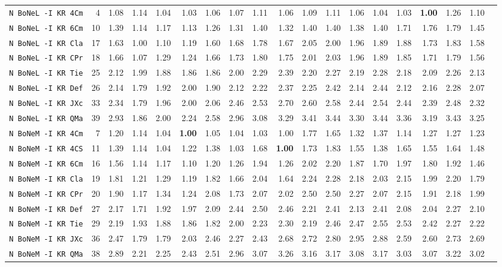 \begin{tabular}{l | r @{~~} r | r@{~~}r@{~~}r@{~~}r@{~~}r@{~~}r@{~~}r@{~~}r@{~~}r@{~~}r@{~~}r@{~~}r@{~~}r@{~~}r@{~~}r@{~~}r|}
\verb+N BoNeL -I KR 4Cm+ & 4 & 1.08 & 1.14&1.04&1.03&1.06&1.07&1.11&1.06&1.09&1.11&1.06&1.04&1.03&\textbf{1.00}&1.26&1.10\\
\verb+N BoNeL -I KR 6Cm+ & 10 & 1.39 & 1.14&1.17&1.13&1.26&1.31&1.40&1.32&1.40&1.40&1.38&1.40&1.71&1.76&1.79&1.45\\
\verb+N BoNeL -I KR Cla+ & 17 & 1.63 & 1.00&1.10&1.19&1.60&1.68&1.78&1.67&2.05&2.00&1.96&1.89&1.88&1.73&1.83&1.58\\
\verb+N BoNeL -I KR CPr+ & 18 & 1.66 & 1.07&1.29&1.24&1.66&1.73&1.80&1.75&2.01&2.03&1.96&1.89&1.85&1.71&1.79&1.56\\
\verb+N BoNeL -I KR Tie+ & 25 & 2.12 & 1.99&1.88&1.86&1.86&2.00&2.29&2.39&2.20&2.27&2.19&2.28&2.18&2.09&2.26&2.13\\
\verb+N BoNeL -I KR Def+ & 26 & 2.14 & 1.79&1.92&2.00&1.90&2.12&2.22&2.37&2.25&2.42&2.14&2.44&2.12&2.16&2.28&2.07\\
\verb+N BoNeL -I KR JXc+ & 33 & 2.34 & 1.79&1.96&2.00&2.06&2.46&2.53&2.70&2.60&2.58&2.44&2.54&2.44&2.39&2.48&2.32\\
\verb+N BoNeL -I KR QMa+ & 39 & 2.93 & 1.86&2.00&2.24&2.58&2.96&3.08&3.29&3.41&3.44&3.30&3.44&3.36&3.19&3.43&3.25\smallskip \\
\verb+N BoNeM -I KR 4Cm+ & 7 & 1.20 & 1.14&1.04&\textbf{1.00}&1.05&1.04&1.03&1.00&1.77&1.65&1.32&1.37&1.14&1.27&1.27&1.23\\
\verb+N BoNeM -I KR 4CS+ & 11 & 1.39 & 1.14&1.04&1.22&1.38&1.03&1.68&\textbf{1.00}&1.73&1.83&1.55&1.38&1.65&1.55&1.64&1.48\\
\verb+N BoNeM -I KR 6Cm+ & 16 & 1.56 & 1.14&1.17&1.10&1.20&1.26&1.94&1.26&2.02&2.20&1.87&1.70&1.97&1.80&1.92&1.46\\
\verb+N BoNeM -I KR Cla+ & 19 & 1.81 & 1.21&1.29&1.19&1.82&1.66&2.04&1.64&2.24&2.28&2.18&2.03&2.15&1.99&2.20&1.79\\
\verb+N BoNeM -I KR CPr+ & 20 & 1.90 & 1.17&1.34&1.24&2.08&1.73&2.07&2.02&2.50&2.50&2.27&2.07&2.15&1.91&2.18&1.99\\
\verb+N BoNeM -I KR Def+ & 27 & 2.17 & 1.71&1.92&1.97&2.09&2.44&2.50&2.46&2.21&2.41&2.13&2.41&2.08&2.04&2.27&2.10\\
\verb+N BoNeM -I KR Tie+ & 29 & 2.19 & 1.93&1.88&1.86&1.82&2.00&2.23&2.30&2.19&2.46&2.47&2.55&2.53&2.42&2.27&2.22\\
\verb+N BoNeM -I KR JXc+ & 36 & 2.47 & 1.79&1.79&2.03&2.46&2.27&2.43&2.68&2.72&2.80&2.95&2.88&2.59&2.60&2.73&2.69\\
\verb+N BoNeM -I KR QMa+ & 38 & 2.89 & 2.21&2.25&2.43&2.51&2.96&3.07&3.26&3.16&3.17&3.08&3.17&3.03&3.07&3.22&3.02\smallskip \\

\end{tabular}
